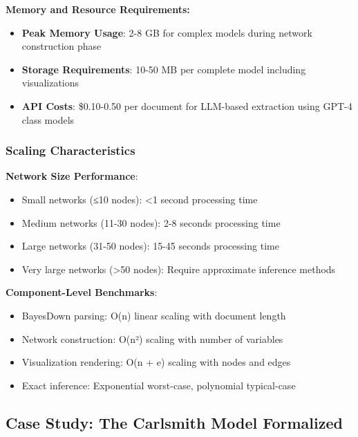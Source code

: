 \documentclass[
  11pt,
  letterpaper,
]{book}
\providecommand{\tightlist}{%
  \setlength{\itemsep}{0pt}\setlength{\parskip}{0pt}}
\begin{document}
\textbf{Memory and Resource Requirements:}

\begin{itemize}
\tightlist
\item
  \textbf{Peak Memory Usage}: 2-8 GB for complex models during network
  construction phase
\item
  \textbf{Storage Requirements}: 10-50 MB per complete model including
  visualizations
\item
  \textbf{API Costs}: \$0.10-0.50 per document for LLM-based extraction
  using GPT-4 class models
\end{itemize}

\subsubsection{Scaling
Characteristics}\label{sec-scaling-characteristics}

\textbf{Network Size Performance}:

\begin{itemize}
\tightlist
\item
  Small networks (≤10 nodes): \textless1 second processing time
\item
  Medium networks (11-30 nodes): 2-8 seconds processing time
\item
  Large networks (31-50 nodes): 15-45 seconds processing time
\item
  Very large networks (\textgreater50 nodes): Require approximate
  inference methods
\end{itemize}

\textbf{Component-Level Benchmarks}:

\begin{itemize}
\tightlist
\item
  BayesDown parsing: O(n) linear scaling with document length
\item
  Network construction: O(n²) scaling with number of variables
\item
  Visualization rendering: O(n + e) scaling with nodes and edges
\item
  Exact inference: Exponential worst-case, polynomial typical-case
\end{itemize}

\subsection{Case Study: The Carlsmith Model
Formalized}\label{sec-carlsmith-case-study}
\end{document}
